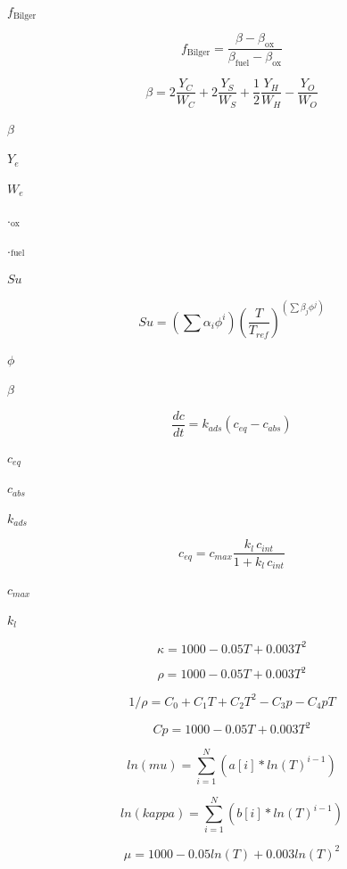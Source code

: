 \documentclass{article}
\begin{document}
$f_{\mathrm{Bilger}}$
\pagebreak

\[
    f_{\mathrm{Bilger}} =
        \frac{\beta - \beta_{\mathrm{ox}}}{\beta_{\mathrm{fuel}}
      - \beta_{\mathrm{ox}}}
\]
\pagebreak

\[
    \beta =
        2\frac{Y_C}{W_C}
      + 2\frac{Y_S}{W_S}
      + \frac{1}{2}\frac{Y_H}{W_H}
      - \frac{Y_O}{W_O}
\]
\pagebreak

$      \beta               $
\pagebreak

$      Y_e                 $
\pagebreak

$      W_e                 $
\pagebreak

$      {.}_{\mathrm{ox}}   $
\pagebreak

$      {.}_{\mathrm{fuel}} $
\pagebreak

$Su$
\pagebreak

\[
    Su = \left( \sum \alpha_i \phi^i \right)
    \left( \frac{T}{T_{ref}} \right)^{\left( \sum \beta_j \phi^j \right)}
\]
\pagebreak

$\phi$
\pagebreak

$\beta$
\pagebreak

\[
    \frac{d c}{d t} = k_{ads} (c_{eq} - c_{abs})
\]
\pagebreak

$      c_{eq}       $
\pagebreak

$      c_{abs}      $
\pagebreak

$      k_{ads}      $
\pagebreak

\[
        c_{eq} = c_{max} \frac{k_l \, c_{int}}{1 + k_l \, c_{int}}
    \]
\pagebreak

$      c_{max}      $
\pagebreak

$      k_l          $
\pagebreak

\[
            \kappa = 1000 - 0.05 T + 0.003 T^2
        \]
\pagebreak

\[
            \rho = 1000 - 0.05 T + 0.003 T^2
        \]
\pagebreak

\[
    1/\rho = C_0 + C_1 T + C_2 T^2 - C_3 p - C_4 p T
\]
\pagebreak

\[
            Cp = 1000 - 0.05 T + 0.003 T^2
        \]
\pagebreak

\[
        ln(mu)    = \sum_{i=1}^N \left( a[i] * ln(T)^{i-1} \right)
    \]
\pagebreak

\[
        ln(kappa) = \sum_{i=1}^N \left( b[i] * ln(T)^{i-1} \right)
    \]
\pagebreak

\[
            \mu    = 1000 - 0.05 ln(T) + 0.003 ln(T)^2
        \]
\pagebreak
\end{document}
